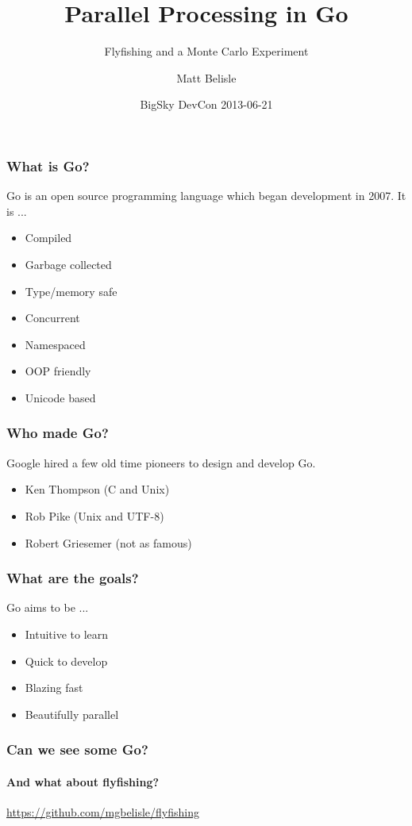 \documentclass{beamer}
\title{Parallel Processing in Go}
\subtitle{Flyfishing and a Monte Carlo Experiment}
\author{Matt Belisle}
\date{BigSky DevCon 2013-06-21}
\begin{document}
\frame{\titlepage}
\begin{frame}
  \frametitle{What is Go?}

  Go is an open source programming language which began development in
  2007.  It is ...
  
  \begin{itemize}
    \item Compiled
    \item Garbage collected
    \item Type/memory safe
    \item Concurrent
    \item Namespaced
    \item OOP friendly
    \item Unicode based
  \end{itemize}
\end{frame}
\begin{frame}
  \frametitle{Who made Go?}

  Google hired a few old time pioneers to design and develop Go.
  
  \begin{itemize}
    \item Ken Thompson (C and Unix)
    \item Rob Pike (Unix and UTF-8)
    \item Robert Griesemer (not as famous)
  \end{itemize}
\end{frame}
\begin{frame}
  \frametitle{What are the goals?}

  Go aims to be ...
  
  \begin{itemize}
    \item Intuitive to learn
    \item Quick to develop
    \item Blazing fast
    \item Beautifully parallel
  \end{itemize}
\end{frame}
\begin{frame}
  \frametitle{Can we see some Go?}
  \framesubtitle{And what about flyfishing?}
  \url{https://github.com/mgbelisle/flyfishing}
\end{frame}
\end{document}
